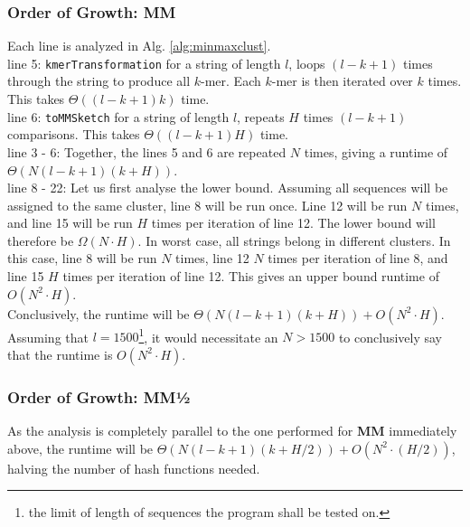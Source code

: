 \documentclass[../../main.tex]{subfiles}
\begin{document}
\subsubsection{Order of Growth: MM}
Each line is analyzed in Alg. \ref{alg:minmaxclust}.\\
line 5: \texttt{kmerTransformation} for a string of length $l$, loops $(l - k + 1)$ times through the string to produce all $k$-mer. Each $k$-mer is then iterated over $k$ times. This takes $\Theta((l-k+1)k)$ time.\\
line 6: \texttt{toMMSketch} for a string of length $l$, repeats $H$ times $(l-k+1)$ comparisons. This takes $\Theta((l-k+1)H)$ time.\\
line 3 - 6: Together, the lines 5 and 6 are repeated $N$ times, giving a runtime of $\Theta(N (l-k+1)(k + H))$.\\
line 8 - 22: Let us first analyse the lower bound. Assuming all sequences will be assigned to the same cluster, line 8 will be run once. Line 12 will be run $N$ times, and line 15 will be run $H$ times per iteration of line 12. The lower bound will therefore be $\Omega(N\cdot H)$. In worst case, all strings belong in different clusters. In this case, line 8 will be run $N$ times, line 12 $N$ times per iteration of line 8, and line 15 $H$ times per iteration of line 12. This gives an upper bound runtime of $O(N^2 \cdot H)$.\\

Conclusively, the runtime will be $\Theta(N (l-k+1)(k + H)) + O(N^2 \cdot H)$. Assuming that $l=1500$\footnote{the limit of length of sequences the program shall be tested on.}, it would necessitate an $N>1500$ to conclusively say that the runtime is $O(N^2 \cdot H)$.
\subsubsection{Order of Growth: MM½}
As the analysis is completely parallel to the one performed for {\bf MM} immediately above, the runtime will be $\Theta(N (l-k+1)(k + H/2)) + O(N^2 \cdot (H/2))$, halving the number of hash functions needed.
\end{document}
